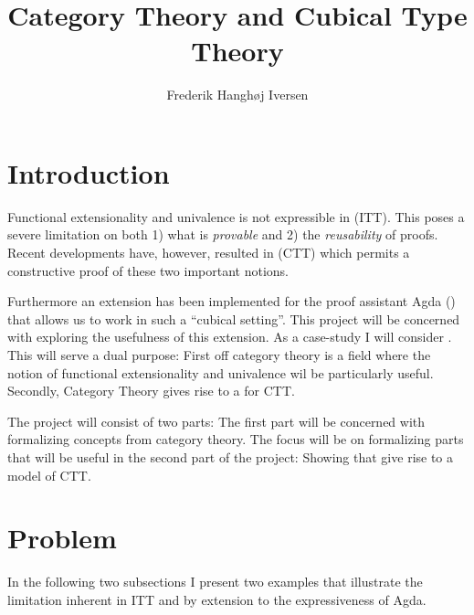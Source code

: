 \documentclass{article}
\title{Category Theory and Cubical Type Theory}
\author{Frederik Hanghøj Iversen}
\begin{document}
\maketitle
%
\section{Introduction}
%
Functional extensionality and univalence is not expressible in
 (ITT). This poses a severe limitation
on both 1) what is \emph{provable} and 2) the \emph{reusability} of proofs.
Recent developments have, however, resulted in  (CTT)
which permits a constructive proof of these two important notions.

Furthermore an extension has been implemented for the proof assistant Agda
(\cite{agda}) that allows us to work in such a ``cubical setting''. This project
will be concerned with exploring the usefulness of this extension. As a
case-study I will consider . This will serve a dual
purpose: First off category theory is a field where the notion of functional
extensionality and univalence wil be particularly useful. Secondly, Category
Theory gives rise to a  for CTT.

The project will consist of two parts: The first part will be concerned with
formalizing concepts from category theory. The focus will be on formalizing
parts that will be useful in the second part of the project: Showing that
 give rise to a model of CTT.
%
\section{Problem}
%
In the following two subsections I present two examples that illustrate the
limitation inherent in ITT and by extension to the expressiveness of Agda.
%
\end{document}
